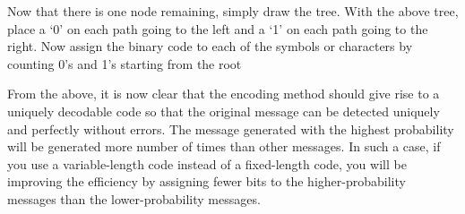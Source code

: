 \documentclass[a4paper, 12pt]{article}
\begin{document}
Now that there is one node remaining, simply draw the tree. With the above tree, place a ‘0’ on each path going to the left and a ‘1’ on each path going to the right. Now assign the binary code to each of the symbols or characters by counting 0’s and 1’s starting from the root
\newline
\newline

From the above, it is now clear that the encoding method should give rise to a uniquely decodable code so that the original message can be detected uniquely and perfectly without errors. The message generated with the highest probability will be generated more number of times than other messages. In such a case, if you use a variable-length code instead of a fixed-length code, you will be improving the efficiency by assigning fewer bits to the higher-probability messages than the lower-probability messages.
\end{document}

